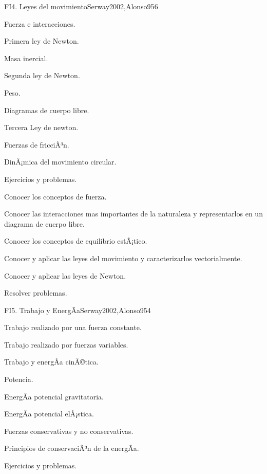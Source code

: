 \begin{syllabus}
\begin{unit}{FI4. Leyes del movimiento}{Serway2002,Alonso95}{6}
\begin{topics}
      \item Fuerza e interacciones.
      \item Primera ley de Newton.
      \item Masa inercial.
      \item Segunda ley de Newton.
      \item Peso.
      \item Diagramas de cuerpo libre.
      \item Tercera Ley de newton.
      \item Fuerzas de fricciÃ³n.
      \item DinÃ¡mica del movimiento circular.
      \item Ejercicios y problemas.
   \end{topics}

   \begin{unitgoals}
      \item Conocer los conceptos de fuerza.
      \item Conocer las interacciones mas importantes de la naturaleza y representarlos en un diagrama de cuerpo libre.
      \item Conocer los conceptos de equilibrio estÃ¡tico.
      \item Conocer y aplicar las leyes del movimiento y caracterizarlos vectorialmente.
      \item Conocer y aplicar las leyes de Newton.
      \item Resolver problemas.
   \end{unitgoals}
\end{unit}

\begin{unit}{FI5. Trabajo y EnergÃ­a}{Serway2002,Alonso95}{4}
\begin{topics}
	\item Trabajo realizado por una fuerza constante.
	\item Trabajo realizado por fuerzas variables.
	\item Trabajo y energÃ­a cinÃ©tica.
	\item Potencia.
	\item EnergÃ­a potencial gravitatoria.
	\item EnergÃ­a potencial elÃ¡stica.
	\item Fuerzas conservativas y no conservativas.
	\item Principios de conservaciÃ³n de la energÃ­a.
	\item Ejercicios y problemas.
\end{topics}


\end{unit}
\end{syllabus}
